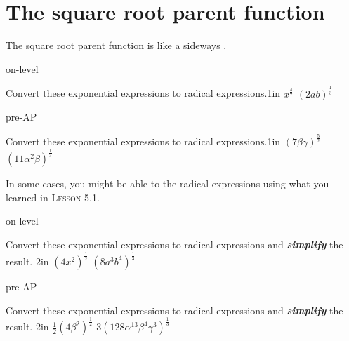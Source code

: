 \section{The square root parent function}
%
The square root parent function is like  a sideways .


\begin{taggedblock}{on-level}
    \begin{myProblems2}{Convert these exponential expressions to radical expressions.}{1in}
        {
            $ x^{\frac{4}{7}}$ 
        }
        {
            $ (2ab)^\frac{1}{3}$ 
        }
    \end{myProblems2}
\end{taggedblock}
\begin{taggedblock}{pre-AP}
    \begin{myProblems2}{Convert these exponential expressions to radical expressions.}{1in}
        {
            \Large $ (7\beta\gamma)^\frac{5}{2}$ 
        }
        {
            \Large $ (11\alpha^2\beta)^\frac{1}{3}$ 
        }
    \end{myProblems2}
\end{taggedblock}


\vspace{\baselineskip}
In some cases, you might be able to  the radical expressions using 
what you learned in {\scshape Lesson 5.1}.

\begin{taggedblock}{on-level}
    \begin{myProblems2}{%
        Convert these exponential expressions to radical expressions
        and \textbf{\itshape simplify} the result.
        }%
        {2in}
        {
            $ \left( 4x^2 \right)^{\frac{1}{2}}$ 
        }
        {
            $ \left( 8a^3b^4 \right)^\frac{1}{3}$ 
        }
    \end{myProblems2}
\end{taggedblock}
\begin{taggedblock}{pre-AP}
    \begin{myProblems2}{%
        Convert these exponential expressions to radical expressions
        and \textbf{\itshape simplify} the result.
        }%
        {2in}
        {
            \Large $ \frac{1}{2} \left( 4\beta^2 \right)^{\frac{1}{2}}$ 
        }
        {
            \Large $ 3 \left( 128\alpha^{13}\beta^4\gamma^3 \right)^\frac{1}{3}$ 
        }
    \end{myProblems2}
\end{taggedblock}


